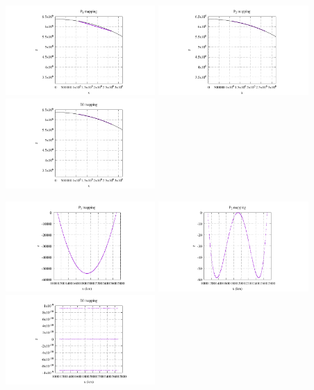 \begin{center}
\includegraphics[width=5.7cm]{images/mappings/DJ/quadrilaterals/xz_P1_boundary.pdf}
\includegraphics[width=5.7cm]{images/mappings/DJ/quadrilaterals/xz_P2_boundary.pdf}
\includegraphics[width=5.7cm]{images/mappings/DJ/quadrilaterals/xz_DJ_boundary.pdf}
\end{center}

\begin{center}
\includegraphics[width=5.7cm]{images/mappings/DJ/quadrilaterals/xz_P1_boundary_error.pdf}
\includegraphics[width=5.7cm]{images/mappings/DJ/quadrilaterals/xz_P2_boundary_error.pdf}
\includegraphics[width=5.7cm]{images/mappings/DJ/quadrilaterals/xz_DJ_boundary_error.pdf}
\end{center}



